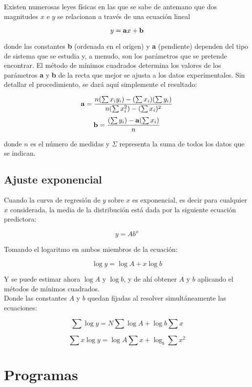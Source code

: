 \documentclass[a4 paper]{article}
\numberwithin{equation}{section}
\newcommand{\0}{\mathbf{0}}
\begin{document}
Existen numerosas leyes f\'isicas en las que se sabe de antemano que dos magnitudes $x$
e $y$ se relacionan a trav\'es de una ecuaci\'on lineal

$$ y = {\bf{a}}x + {\bf{b}} $$

donde las constantes {\bf{b}} (ordenada en el origen) y {\bf{a}} (pendiente) dependen del tipo de sistema que se estudia y, a menudo, son los par\'ametros que se pretende encontrar. El m\'etodo de m\'inimos cuadrados determina los valores de los par\'ametros {\bf{a}} y {\bf{b}} de la recta que mejor se ajusta a los datos experimentales. Sin detallar el procedimiento, se dar\'a aqu\'i simplemente el resultado: 

$$ {\bf{a}} = \frac{n({\sum x_{i}y_{i}})-({\sum x_{i}})({\sum y_{i}})}{n(\sum x_{i}^{2})-({\sum x_{i}})^{2}} $$
\vspace*{0.2cm}
$$ {\bf{b}} = \frac{(\sum y_{i})-{\bf{a}}({\sum x_{i}})}{n} $$

donde $n$ es el n\'umero de medidas y $\Sigma$ representa la suma de todos los datos que se indican.

\newpage

\subsection*{Ajuste exponencial}

Cuando la curva de regresi\'on de $y$ sobre $x$ es exponencial, es decir para cualquier $x$ considerada, la media de la distribuci\'on est\'a dada por la siguiente ecuaci\'on predictora:

$$ y = Ab^{x} $$

Tomando el logaritmo en ambos miembros de la ecuaci\'on:

$$\log{y} = \log{A} + x\log{b} $$

Y se puede estimar ahora $\log{A}$ y $\log{b}$, y de ah\'i obtener $A$ y $b$ aplicando el m\'etodos de m\'inimos cuadrados.\\

Donde las constantes $A$ y $b$ quedan fijadas al resolver simult\'aneamente las ecuaciones:

$${\sum \log{y}} = N{\sum \log{A}} + {\log{b}}{\sum x}$$

$${\sum x}\log{y} = \log{A}{\sum x} + \log_{b}{\sum x^{2}} $$



\section*{Programas}
\end{document}
